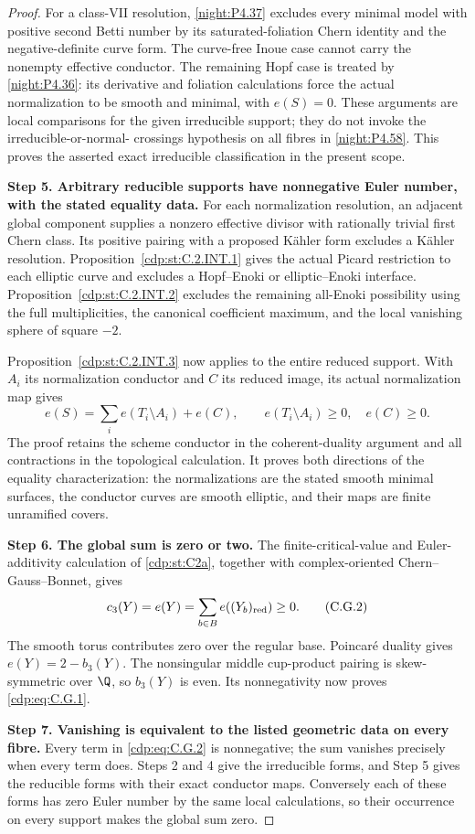 \begin{proof}
For a class-VII resolution, \ref{night:P4.37} excludes
every minimal model with positive second Betti number
by its saturated-foliation Chern identity and the
negative-definite curve form. The curve-free Inoue
case cannot carry the nonempty effective conductor.
The remaining Hopf case is treated by
\ref{night:P4.36}: its derivative and foliation
calculations force the actual normalization to be
smooth and minimal, with $e(S)=0$. These arguments
are local comparisons for the given irreducible
support; they do not invoke the irreducible-or-normal-
crossings hypothesis on all fibres in
\ref{night:P4.58}. This proves the asserted exact
irreducible classification in the present scope.

\medskip\noindent\textbf{Step 5. Arbitrary reducible supports
have nonnegative Euler number, with the stated equality data.}
For each normalization resolution, an adjacent global
component supplies a nonzero effective divisor with
rationally trivial first Chern class. Its positive
pairing with a proposed K\"ahler form excludes a
K\"ahler resolution. Proposition~\ref{cdp:st:C.2.INT.1}
gives the actual Picard restriction to each elliptic
curve and excludes a Hopf--Enoki or elliptic--Enoki
interface. Proposition~\ref{cdp:st:C.2.INT.2} excludes
the remaining all-Enoki possibility using the full
multiplicities, the canonical coefficient maximum,
and the local vanishing sphere of square $-2$.

Proposition~\ref{cdp:st:C.2.INT.3} now applies to the
entire reduced support. With $A_i$ its normalization
conductor and $C$ its reduced image, its actual
normalization map gives
\[
 e(S)=\sum_i e(T_i\setminus A_i)+e(C),
 \qquad e(T_i\setminus A_i)\ge0,\quad e(C)\ge0.
\]
The proof retains the scheme conductor in the
coherent-duality argument and all contractions in
the topological calculation. It proves both
directions of the equality characterization:
the normalizations are the stated smooth minimal
surfaces, the conductor curves are smooth elliptic,
and their maps are finite unramified covers.

\medskip\noindent\textbf{Step 6. The global sum is zero or two.}
The finite-critical-value and Euler-additivity
calculation of \ref{cdp:st:C2a}, together with
complex-oriented Chern--Gauss--Bonnet, gives
\[
 c_3(Y)=e(Y)=\sum_{b\in B}e((Y_b)_{\rm red})\ge0.
 \tag{C.G.2}\label{cdp:eq:C.G.2}
\]
The smooth torus contributes zero over the regular
base. Poincar\'e duality gives $e(Y)=2-b_3(Y)$.
The nonsingular middle cup-product pairing is
skew-symmetric over $\Q$, so $b_3(Y)$ is even.
Its nonnegativity now proves \eqref{cdp:eq:C.G.1}.

\medskip\noindent\textbf{Step 7. Vanishing is equivalent to
the listed geometric data on every fibre.}
Every term in \eqref{cdp:eq:C.G.2} is nonnegative;
the sum vanishes precisely when every term does.
Steps 2 and 4 give the irreducible forms, and
Step 5 gives the reducible forms with their exact
conductor maps. Conversely each of these forms has
zero Euler number by the same local calculations,
so their occurrence on every support makes the
global sum zero.
\end{proof}
